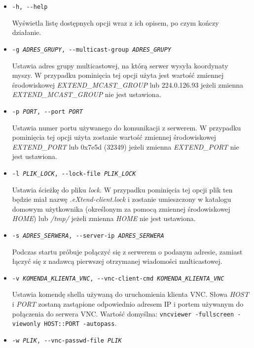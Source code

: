   \begin{itemize}
    \item \texttt{-h, -{}-help}

      Wyświetla listę dostępnych opcji wraz z ich opisem, po czym kończy działanie.

    \item \texttt{-g \emph{ADRES\_GRUPY}, -{}-multicast-group \emph{ADRES\_GRUPY}}

      Ustawia adres grupy multicastowej, na którą serwer wysyła koordynaty myszy. W przypadku pominięcia tej opcji użyta jest wartość zmiennej środowiskowej \emph{EXTEND\_MCAST\_GROUP} lub 224.0.126.93 jeżeli zmienna \emph{EXTEND\_MCAST\_GROUP} nie jest ustawiona.

    \item \texttt{-p \emph{PORT}, -{}-port \emph{PORT}}

      Ustawia numer portu używanego do komunikacji z serwerem. W przypadku pominięcia tej opcji użyta zostanie wartość zmiennej środowiskowej \emph{EXTEND\_PORT} lub 0x7e5d (32349) jeżeli zmienna \emph{EXTEND\_PORT} nie jest ustawiona.

    \item \texttt{-l \emph{PLIK\_LOCK}, -{}-lock-file \emph{PLIK\_LOCK}}

      Ustawia ścieżkę do pliku \emph{lock}. W przypadku pominięcia tej opcji plik ten będzie miał nazwę \emph{.eXtend-client.lock} i zostanie umieszczony w katalogu domowym użytkownika (określonym za pomocą zmiennej środowiskowej \emph{HOME}) lub \emph{/tmp/} jeżeli zmienna \emph{HOME} nie jest ustawiona.

    \item \texttt{-s \emph{ADRES\_SERWERA}, -{}-server-ip \emph{ADRES\_SERWERA}}

      Podczas startu próbuje połączyć się z serwerem o podanym adresie, zamiast łączyć się z nadawcą pierwszej otrzymanej wiadomości multicastowej.

    \item \texttt{-v \emph{KOMENDA\_KLIENTA\_VNC}, -{}-vnc-client-cmd \emph{KOMENDA\_KLIENTA\_VNC}}

       Ustawia komendę shella używaną do uruchomienia klienta VNC. Słowa \emph{HOST} i \emph{PORT} zostaną zastąpione odpowiednio adresem IP i portem używanym do połączenia do serwera VNC. Wartość domyślna: \texttt{vncviewer -fullscreen -viewonly HOST::PORT -autopass}.

    \item \texttt{-w \emph{PLIK}, -{}-vnc-passwd-file \emph{PLIK}}


\end{itemize}
